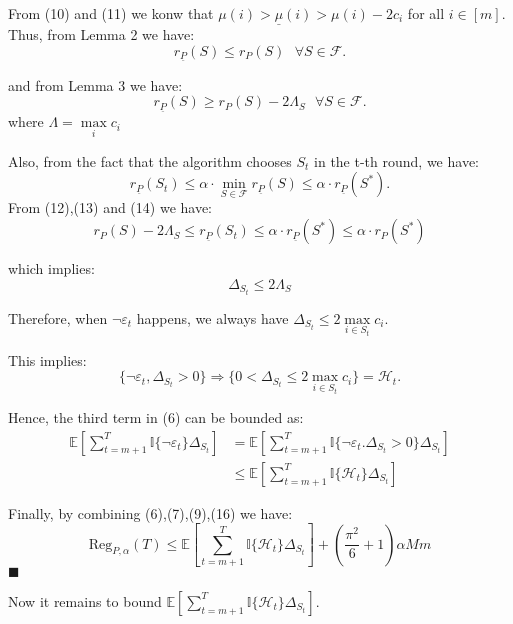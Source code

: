 \documentclass[opre,sglanonrev]{informs4}
\begin{document}
From (10) and (11) we  konw that $\mu(i)>\underline{\mu}(i)>\mu(i)-2c_i$ for all $i \in [m]$. Thus, from Lemma 2 we have:
\begin{equation}
	r_{\underline{P}}(S)\leq r_P(S) ~~~ \forall S \in \mathcal{F}.
\end{equation}

and from Lemma 3 we have:
\begin{equation}
	r_{\underline{P}}(S)\geq r_P(S)-2\Lambda_S ~~~ \forall S \in \mathcal{F}.
\end{equation}
where $\Lambda = \mathop{\max}\limits_{i}c_i$

Also, from the fact that the algorithm chooses $S_t$ in the t-th round, we have:
\begin{equation}
	r_{\underline{P}}(S_t)\leq \alpha \cdot \mathop{\min}\limits_{S \in \mathcal{F}}r_{\underline{P}}(S) \leq \alpha \cdot r_{\underline{P}}(S^*).
\end{equation}
From (12),(13) and (14) we have:
\begin{equation}
	r_P(S)-2\Lambda_S \leq r_{\underline{P}}(S_t) \leq \alpha \cdot r_{\underline{P}}(S^*) \leq \alpha \cdot r_P(S^*)
\end{equation}

which implies:
$$
	\Delta_{S_t} \leq 2\Lambda_S
$$

Therefore, when $\lnot \varepsilon_t$ happens, we always have $\Delta_{S_t}\leq 2\mathop{\max}\limits_{i\in S_t}c_i$.

This implies:
$$
	\{\lnot \varepsilon_t, \Delta_{S_t}>0\}\Longrightarrow \{0<\Delta_{S_t}\leq 2\mathop{\max}\limits_{i\in S_t}c_i\}=\mathcal{H}_t.
$$

Hence, the third term in (6) can be bounded as:
\begin{equation}
	\begin{aligned}
		\mathbb{E}[\sum_{t=m+1}^{T}\mathbb{I}\{\lnot \varepsilon_t\}\Delta_{S_t}] &= \mathbb{E}[\sum_{t=m+1}^{T}\mathbb{I}\{\lnot \varepsilon_t. \Delta_{S_t}>0\}\Delta_{S_t}]\\
		&\leq \mathbb{E}[\sum_{t=m+1}^{T}\mathbb{I}\{\mathcal{H}_t\}\Delta_{S_t}]
	\end{aligned}
\end{equation}

Finally, by combining (6),(7),(9),(16) we have:
$$
	\text{Reg}_{P,\alpha}(T) \leq \mathbb{E}[\sum_{t=m+1}^{T}\mathbb{I}\{\mathcal{H}_t\}\Delta_{S_t}] + (\frac{\pi^2}{6}+1)\alpha M m
$$
\hfill $\blacksquare$

Now it remains to bound $\mathbb{E}[\sum_{t=m+1}^{T}\mathbb{I}\{\mathcal{H}_t\}\Delta_{S_t}]$.
\end{document}
